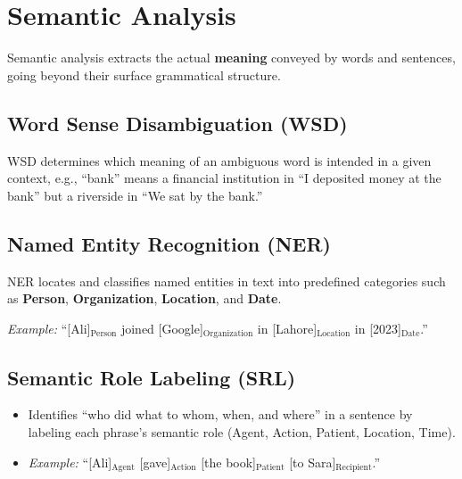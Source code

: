 \documentclass[11pt,a4paper]{article}
\begin{document}
\section{Semantic Analysis}

\begin{definitionbox}
Semantic analysis extracts the actual \textbf{meaning} conveyed by words and sentences, going beyond their surface grammatical structure.
\end{definitionbox}

\subsection{Word Sense Disambiguation (WSD)}
\begin{conceptbox}[WSD]
WSD determines which meaning of an ambiguous word is intended in a given context, e.g., ``bank'' means a financial institution in ``I deposited money at the bank'' but a riverside in ``We sat by the bank.''
\end{conceptbox}

\subsection{Named Entity Recognition (NER)}
\begin{definitionbox}[NER]
NER locates and classifies named entities in text into predefined categories such as \textbf{Person}, \textbf{Organization}, \textbf{Location}, and \textbf{Date}.
\end{definitionbox}
\textit{Example:} ``[Ali]$_{\text{Person}}$ joined [Google]$_{\text{Organization}}$ in [Lahore]$_{\text{Location}}$ in [2023]$_{\text{Date}}$.''

\subsection{Semantic Role Labeling (SRL)}
\begin{itemize}[leftmargin=*]
  \item Identifies ``who did what to whom, when, and where'' in a sentence by labeling each phrase's semantic role (Agent, Action, Patient, Location, Time).
  \item \textit{Example:} ``[Ali]$_{\text{Agent}}$ [gave]$_{\text{Action}}$ [the book]$_{\text{Patient}}$ [to Sara]$_{\text{Recipient}}$.''
\end{itemize}
\end{document}
